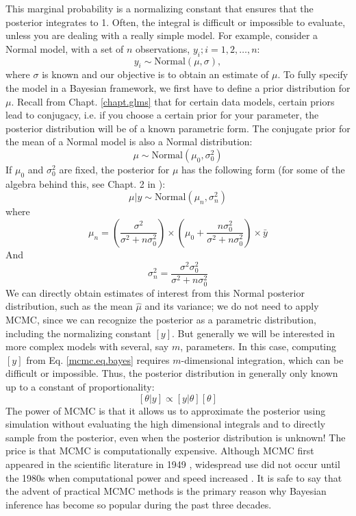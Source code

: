 This marginal probability is a normalizing constant that ensures that
the posterior integrates to 1. Often, the
integral is difficult or impossible to evaluate, unless you are
dealing with a really simple model.  For example, consider 
a Normal model, with a set of $n$ observations, $y_{i};
i=1,2,\ldots,n$: 
\[
 y_{i} \sim \mbox{Normal}(\mu, \sigma),
\]
where $\sigma$ is known and our objective is to obtain an estimate of
$\mu$. To fully specify the model in a Bayesian
framework, we first have to define a prior distribution for $\mu$. Recall
from Chapt. \ref{chapt.glms} 
that for certain data models, certain priors lead to
conjugacy, i.e. if you choose a certain prior for your parameter,
the posterior distribution will be of a known parametric form. The
conjugate prior for the mean of a Normal model is also a Normal
distribution:
\[
\mu \sim \mbox{Normal}(\mu_0, \sigma_{0}^{2})
\]
If $\mu_{0}$ and $\sigma_{0}^{2}$ are fixed, the posterior for $\mu$
has the following form (for some of the algebra behind this, see Chapt. 2 in \citet{gelman_etal:2004}):
\begin{equation}
\mu|y \sim \mbox{Normal}(\mu_{n}, \sigma_{n}^{2})
\label{mcmc.eq.mu-posterior}
\end{equation}
where
\[
\mu_{n} = \left( \frac{ \sigma^{2}}  {\sigma^{2}   +n \sigma_{0}^{2}} \right) \times  \left(\mu_0 +      \frac{n  \sigma_{0}^{2}}  {\sigma^{2}   +n \sigma_{0}^{2}} \right) \times\bar{y}
\]
And
\[
 \sigma_{n}^{2} = \frac{\sigma^{2}  \sigma_{0}^{2}} {\sigma^{2} + n \sigma_{0}^{2}}
\]
We can directly obtain estimates of interest from this Normal
posterior distribution, such as the mean $\hat{\mu}$ and its variance; we
do not need to apply MCMC, since we can recognize the posterior as a
parametric distribution, including the normalizing constant $[y]$.
But generally we will be interested in more complex models with
several, say $m$, parameters. In this case, computing $[y]$ from
Eq. \ref{mcmc.eq.bayes} requires $m$-dimensional integration, which
can be difficult or impossible. Thus, the posterior distribution in
generally only known up to a constant of proportionality:
\[
[\theta|y] \propto [y|\theta]  [\theta]
\]
The power of MCMC is that it allows us to approximate the posterior
using simulation without evaluating the high dimensional integrals and
to directly sample from the posterior, even when the posterior
distribution is unknown! The price is that MCMC is computationally
expensive. Although MCMC first appeared in the scientific literature
in 1949 \citep{metropolis_etal:1949}, widespread use did not occur
until the 1980s when computational power and speed increased
\citep{gelfand_smith:1990}. It is safe to say that the advent of
practical MCMC methods is the primary reason why Bayesian inference
has become so popular during the past three decades.

